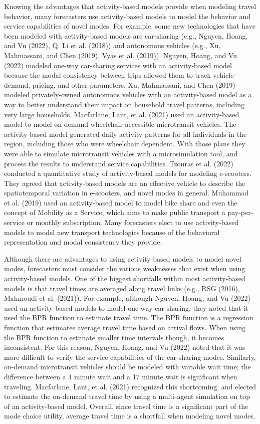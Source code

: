 \documentclass[12pt, oneside, openright]{byuthesis}
\begin{document}
Knowing the advantages that activity-based models provide when modeling travel behavior, many forecasters use activity-based models to model the behavior and service capabilities of novel modes. For example, some new technologies that have been modeled with activity-based models are car-sharing (e.g., Nguyen, Hoang, and Vu (2022), Q. Li et al. (2018)) and autonomous vehicles (e.g., Xu, Mahmassani, and Chen (2019), Vyas et al. (2019)). Nguyen, Hoang, and Vu (2022) modeled one-way car-sharing services with an activity-based model because the modal consistency between trips allowed them to track vehicle demand, pricing, and other parameters. Xu, Mahmassani, and Chen (2019) modeled privately-owned autonomous vehicles with an activity-based model as a way to better understand their impact on household travel patterns, including very large households. Macfarlane, Lant, et al. (2021) used an activity-based model to model on-demand wheelchair accessible microtransit vehicles. The activity-based model generated daily activity patterns for all individuals in the region, including those who were wheelchair dependent. With those plans they were able to simulate microtransit vehicles with a microsimulation tool, and process the results to understand service capabilities. Tzouras et al. (2022) conducted a quantitative study of activity-based models for modeling e-scooters. They agreed that activity-based models are an effective vehicle to describe the spatiotemporal variation in e-scooters, and novel modes in general. Muhammad et al. (2019) used an activity-based model to model bike share and even the concept of Mobility as a Service, which aims to make public transport a pay-per-service or monthly subscription. Many forecasters elect to use activity-based models to model new transport technologies because of the behavioral representation and modal consistency they provide.

Although there are advantages to using activity-based models to model novel modes, forecasters must consider the various weaknesses that exist when using activity-based models. One of the biggest shortfalls within most activity-based models is that travel times are averaged along travel links (e.g., RSG (2016), Mahmoudi et al. (2021)). For example, although Nguyen, Hoang, and Vu (2022) used an activity-based models to model one-way car sharing, they noted that it used the BPR function to estimate travel time. The BPR function is a regression function that estimates average travel time based on arrival flows. When using the BPR function to estimate smaller time intervals though, it becomes inconsistent. For this reason, Nguyen, Hoang, and Vu (2022) noted that it was more difficult to verify the service capabilities of the car-sharing modes. Similarly, on-demand microtransit vehicles should be modeled with variable wait time; the difference between a 4 minute wait and a 17 minute wait is significant when traveling. Macfarlane, Lant, et al. (2021) recognized this shortcoming, and elected to estimate the on-demand travel time by using a multi-agent simulation on top of an activity-based model. Overall, since travel time is a significant part of the mode choice utility, average travel time is a shortfall when modeling novel modes.
\end{document}
